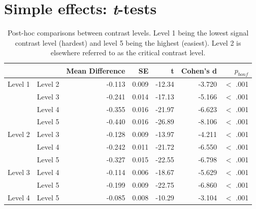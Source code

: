 \newpage

\section{Simple effects: \textit{t}-tests}
\label{Appendix:ttestsWheel}

\begin{table}[h]
	\centering
	\caption{Post-hoc comparisons between contrast levels. Level 1 being the lowest signal contrast level (hardest) and level 5 being the highest (easiest). Level 2 is elsewhere referred to as the critical contrast level. }
	\begin{tabular}{lrrrrrr}
		\hline
		 &  & Mean Difference & SE & t & Cohen's d & $p_{bonf}$  \\
		\hline
		Level 1 & Level 2 & -0.113 & 0.009 & -12.34 & -3.720 & $<$ .001  \\
		  & Level 3 & -0.241 & 0.014 & -17.13 & -5.166 & $<$ .001  \\
		 & Level 4 & -0.355 & 0.016 & -21.97 & -6.623 & $<$ .001  \\
		 & Level 5 & -0.440 & 0.016 & -26.89 & -8.106 & $<$ .001  \\
		Level 2 & Level 3 & -0.128 & 0.009 & -13.97 & -4.211 & $<$ .001  \\
		  & Level 4 & -0.242 & 0.011 & -21.72 & -6.550 & $<$ .001  \\
		 & Level 5 & -0.327 & 0.015 & -22.55 & -6.798 & $<$ .001  \\
		Level 3 & Level 4 & -0.114 & 0.006 & -18.67 & -5.629 & $<$ .001  \\
		  & Level 5 & -0.199 & 0.009 & -22.75 & -6.860 & $<$ .001  \\
		Level 4 & Level 5 & -0.085 & 0.008 & -10.29 & -3.104 & $<$ .001  \\
		\hline\hline
	\end{tabular} 
	\label{tab:ttest_ContrastLevels}
\end{table}

